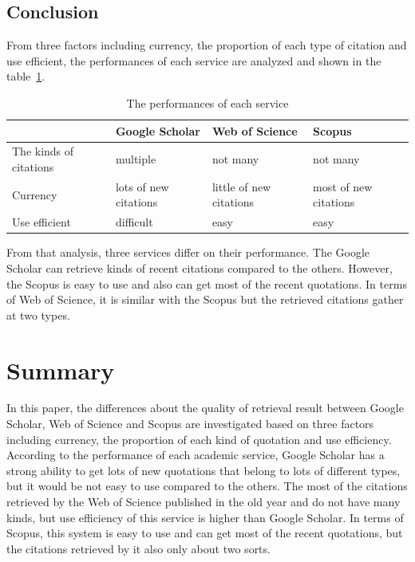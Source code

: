 \documentclass[runningheads]{llncs}
\begin{document}
\subsection{Conclusion}
From three factors including currency, the proportion of each type of citation and use efficient, the performances of each service are analyzed and shown in the table~\ref{tab:my_label4}.
\begin{table}[ht]
    \setlength{\abovecaptionskip}{10pt}%
    \setlength{\belowcaptionskip}{0pt}%
    \caption{The performances of each service }
    \label{tab:my_label4}
    \centering
    \begin{tabular}{|l|l|l|l|}
    \hline
         &Google Scholar& Web of Science& Scopus  \\
    \hline
         The kinds of citations & multiple & not many & not many \\
    
         Currency & lots of new citations & little of new citations & most of  new citations \\
    
         Use efficient  & difficult & easy & easy \\
         
    \hline
    \end{tabular}

\end{table}
\par\noindent
From that analysis, three services differ on their performance. The Google Scholar can retrieve kinds of recent citations compared to the others. However, the Scopus is easy to use and also can get most of the recent quotations. In terms of Web of Science, it is similar with the Scopus but the retrieved citations gather at two types.


\section{Summary}

In this paper, the differences about the quality of retrieval result between Google Scholar, Web of Science and Scopus are investigated based on three factors including currency, the proportion of each kind of quotation and use efficiency. According to the performance of each academic service, Google Scholar has a strong ability to get lots of new quotations that belong to lots of different types, but it would be not easy to use compared to the others. The most of the citations retrieved by the Web of Science published in the old year and do not have many kinds, but use efficiency of this service is higher than Google Scholar. In terms of Scopus, this system is easy to use and can get most of the recent quotations, but the citations retrieved by it also only about two sorts.



%
%
%
% 
% 
%


\end{document}
